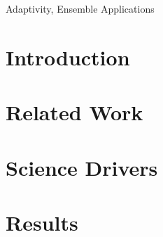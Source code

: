 \documentclass[conference]{IEEEtran}
\begin{document}
\begin{IEEEkeywords}
Adaptivity, Ensemble Applications
\end{IEEEkeywords}


\section{Introduction}\label{sec:intro}



\section{Related Work}\label{sec:related_work}



\section{Science Drivers}\label{sec:science_motiv}


\section{Results}\label{sec:exps}



% 


\end{document}
